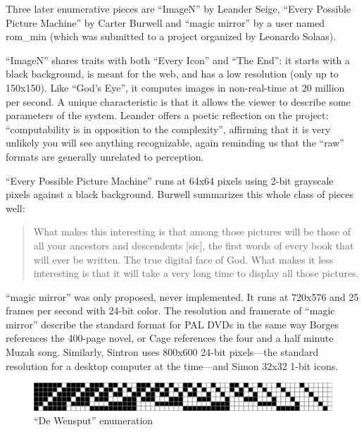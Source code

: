 \documentclass{thesis}
\begin{document}
Three later enumerative pieces are ``ImageN'' by Leander Seige\cite{leander_seige_imagen_????}, ``Every Possible Picture Machine'' by Carter Burwell\cite{carter_burwell_every_????} and ``magic mirror'' by a user named rom\_min\cite{leonardo_solaas_magic_????} (which was submitted to a project organized by Leonardo Solaas).
	
``ImageN'' shares traits with both ``Every Icon'' and ``The End'': it starts with a black background, is meant for the web, and has a low resolution (only up to 150x150). Like ``God's Eye'', it computes images in non-real-time at 20 million per second. A unique characteristic is that it allows the viewer to describe some parameters of the system. Leander offers a poetic reflection on the project: ``computability is in opposition to the complexity'', affirming that it is very unlikely you will see anything recognizable, again reminding us that the ``raw'' formats are generally unrelated to perception.
	
``Every Possible Picture Machine'' runs at 64x64 pixels using 2-bit grayscale pixels against a black background. Burwell summarizes this whole class of pieces well:
	
	\begin{quote}
	What makes this interesting is that among those pictures will be those of all your ancestors and descendents [sic], the first words of every book that will ever be written. The true digital face of God. What makes it less interesting is that it will take a very long time to display all those pictures.
	\end{quote}
	
``magic mirror'' was only proposed, never implemented. It runs at 720x576 and 25 frames per second with 24-bit color. The resolution and framerate of ``magic mirror'' describe the standard format for PAL DVDs in the same way Borges references the 400-page novel, or Cage references the four and a half minute Muzak song. Similarly, Sintron uses 800x600 24-bit pixels---the standard resolution for a desktop computer at the time---and Simon 32x32 1-bit icons.
	
\begin{figure}
	\begin{center}
		\includegraphics[scale=.8]{graphics/dewensput-bitmap.pdf}
		\caption{``De Wensput'' enumeration}
		\label{dewensput-bitmap}
	\end{center}
\end{figure}
\end{document}
